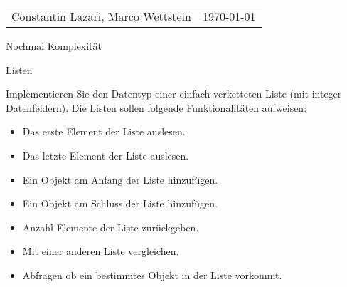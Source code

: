 
\begin{tabularx}{\textwidth}{Xr}
  Constantin Lazari, Marco Wettstein & \today\\
\end{tabularx}

\begin{questions}
  \question
  Nochmal Komplexität

	\question
	Listen
	
	Implementieren Sie den Datentyp einer einfach verketteten Liste (mit integer Datenfeldern). Die Listen sollen folgende Funktionalitäten aufweisen:
	
	\begin{itemize}
	\item  Das erste Element der Liste auslesen.
	\item Das letzte Element der Liste auslesen.
	\item Ein Objekt am Anfang der Liste hinzufügen.
	\item Ein Objekt am Schluss der Liste hinzufügen.
	\item Anzahl Elemente der Liste zurückgeben.
	\item Mit einer anderen Liste vergleichen.
	\item Abfragen ob ein bestimmtes Objekt in der Liste vorkommt.
	\end{itemize}

	\begin{solutionordottedlines}[2cm]
	[language=Java]
	\end{solutionordottedlines}
		


\end{questions}
